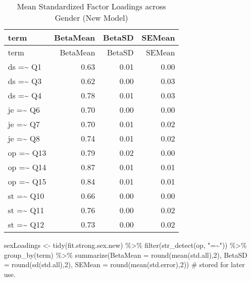 \documentclass[
  letterpaper,
  DIV=11,
  numbers=noendperiod]{scrartcl}
\newenvironment{Shaded}{\begin{snugshade}}{\end{snugshade}}
\newcommand{\AttributeTok}[1]{\textcolor[rgb]{0.40,0.45,0.13}{#1}}
\newcommand{\CommentTok}[1]{\textcolor[rgb]{0.37,0.37,0.37}{#1}}
\newcommand{\DecValTok}[1]{\textcolor[rgb]{0.68,0.00,0.00}{#1}}
\newcommand{\FunctionTok}[1]{\textcolor[rgb]{0.28,0.35,0.67}{#1}}
\newcommand{\NormalTok}[1]{\textcolor[rgb]{0.00,0.23,0.31}{#1}}
\newcommand{\OtherTok}[1]{\textcolor[rgb]{0.00,0.23,0.31}{#1}}
\newcommand{\SpecialCharTok}[1]{\textcolor[rgb]{0.37,0.37,0.37}{#1}}
\newcommand{\StringTok}[1]{\textcolor[rgb]{0.13,0.47,0.30}{#1}}
\begin{document}
\begin{longtable}[]{@{}lrrr@{}}
\caption{Mean Standardized Factor Loadings across Gender (New
Model)}\tabularnewline
\toprule\noalign{}
term & BetaMean & BetaSD & SEMean \\
\midrule\noalign{}
\endfirsthead
\toprule\noalign{}
term & BetaMean & BetaSD & SEMean \\
\midrule\noalign{}
\endhead
\bottomrule\noalign{}
\endlastfoot
ds =\textasciitilde{} Q1 & 0.63 & 0.01 & 0.00 \\
ds =\textasciitilde{} Q3 & 0.62 & 0.00 & 0.03 \\
ds =\textasciitilde{} Q4 & 0.78 & 0.01 & 0.03 \\
je =\textasciitilde{} Q6 & 0.70 & 0.00 & 0.00 \\
je =\textasciitilde{} Q7 & 0.70 & 0.01 & 0.02 \\
je =\textasciitilde{} Q8 & 0.74 & 0.01 & 0.02 \\
op =\textasciitilde{} Q13 & 0.79 & 0.02 & 0.00 \\
op =\textasciitilde{} Q14 & 0.87 & 0.01 & 0.01 \\
op =\textasciitilde{} Q15 & 0.84 & 0.01 & 0.01 \\
st =\textasciitilde{} Q10 & 0.66 & 0.00 & 0.00 \\
st =\textasciitilde{} Q11 & 0.76 & 0.00 & 0.02 \\
st =\textasciitilde{} Q12 & 0.73 & 0.00 & 0.02 \\
\end{longtable}

\begin{Shaded}
\begin{Highlighting}[]
\NormalTok{sexLoadings }\OtherTok{\textless{}{-}} \FunctionTok{tidy}\NormalTok{(fit.strong.sex.new) }\SpecialCharTok{\%\textgreater{}\%}
  \FunctionTok{filter}\NormalTok{(}\FunctionTok{str\_detect}\NormalTok{(op, }\StringTok{"=\textasciitilde{}"}\NormalTok{)) }\SpecialCharTok{\%\textgreater{}\%}
  \FunctionTok{group\_by}\NormalTok{(term) }\SpecialCharTok{\%\textgreater{}\%}
  \FunctionTok{summarize}\NormalTok{(}\AttributeTok{BetaMean =} \FunctionTok{round}\NormalTok{(}\FunctionTok{mean}\NormalTok{(std.all),}\DecValTok{2}\NormalTok{), }
            \AttributeTok{BetaSD =} \FunctionTok{round}\NormalTok{(}\FunctionTok{sd}\NormalTok{(std.all),}\DecValTok{2}\NormalTok{), }
            \AttributeTok{SEMean =} \FunctionTok{round}\NormalTok{(}\FunctionTok{mean}\NormalTok{(std.error),}\DecValTok{2}\NormalTok{))}
\CommentTok{\# stored for later use.}
\end{Highlighting}
\end{Shaded}
\end{document}
